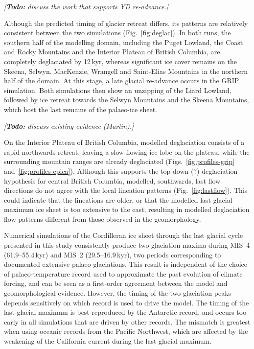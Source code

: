 \documentclass[tc, manuscript]{copernicus}
\newcommand{\todo}[1]{\emph{[\textbf{Todo:} #1]}}
\begin{document}
\todo{discuss the work that supports YD re-advance.}

Although the predicted timing of glacier retreat differs, its patterns are
relatively consistent between the two simulations (Fig.~\ref{fig:deglac}). In
both runs, the southern half of the modelling domain, including the Puget
Lowland, the Coast and Rocky Mountains and the Interior Plateau of British
Columbia, are completely deglaciated by 12\,kyr, whereas significant
ice cover remains on the Skeena, Selwyn, MacKenzie, Wrangell and Saint-Elias Mountains
in the northern half of the domain. At this stage, a late glacial re-advance
occurs in the GRIP simulation. Both simulations then show an unzipping of the
Liard Lowland, followed by ice retreat towards the Selwyn Mountains and the
Skeena Mountains, which host the last remains of the palaeo-ice sheet.

\todo{discuss existing evidence (Martin).}

On the Interior Plateau of British Columbia, modelled deglaciation consists of
a rapid northwards retreat, leaving a slow-flowing ice lobe on the
plateau, while the surrounding mountain ranges are already deglaciated
(Figs.~\ref{fig:profiles-grip} and~\ref{fig:profiles-epica}). Although this
supports the top-down (?)
deglaciation hypothesis for central British Columbia, modelled, southwards,
last flow directions do not agree with the local lineation patterns
(Fig.~\ref{fig:lastflow}). This could indicate that the lineations are older,
or that the modelled last glacial maximum ice sheet is too extensive to the
east, resulting in modelled deglaciation flow patterns different from those
observed in the geomorphology.

\conclusions
\label{sec:concl}

Numerical simulations of the Cordilleran ice sheet through the last glacial
cycle presented in this study consistently produce two glaciation maxima during
MIS~4 (61.9--55.4\,kyr) and MIS~2 (29.5--16.9\,kyr), two periods
corresponding to documented extensive palaeo-glaciations. This result is
independent of the choice of palaeo-temperature record used to approximate the
past evolution of climate forcing, and
can be seen as a first-order agreement between the model and geomorphological
evidence. However, the timing of the two glaciation peaks depends sensitively
on which record
is used to drive the model. The timing of the last glacial maximum is best
reproduced by the Antarctic record, and occurs too early in all simulations
that are driven by other records. The mismatch is greatest when using
oceanic records from the Pacific Northwest, which are affected by the
weakening of the California current during the last glacial maximum.
\end{document}
